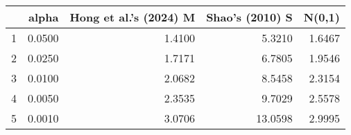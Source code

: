 \begin{table}[ht]
\centering
\begin{tabular}{rrrrr}
  \hline
 & alpha & Hong et al.'s (2024) M & Shao's (2010) S & N(0,1) \\ 
  \hline
1 & 0.0500 & 1.4100 & 5.3210 & 1.6467 \\ 
  2 & 0.0250 & 1.7171 & 6.7805 & 1.9546 \\ 
  3 & 0.0100 & 2.0682 & 8.5458 & 2.3154 \\ 
  4 & 0.0050 & 2.3535 & 9.7029 & 2.5578 \\ 
  5 & 0.0010 & 3.0706 & 13.0598 & 2.9995 \\ 
   \hline
\end{tabular}
\end{table}
